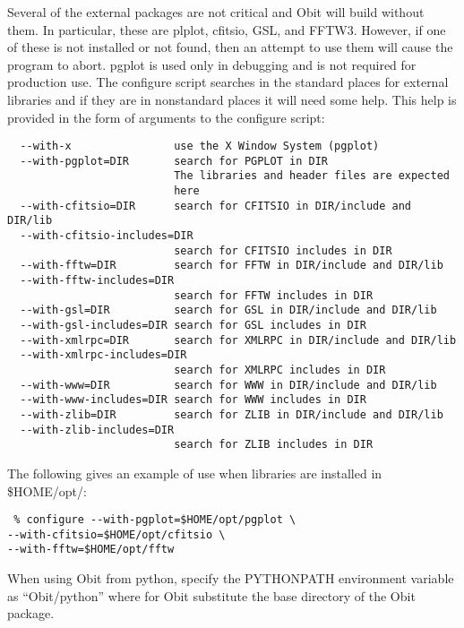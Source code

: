 \documentclass[11pt]{article}
\begin{document}
Several of the external packages are not critical and Obit will build
without them.
In particular, these are plplot, cfitsio, GSL, and FFTW3.
However, if one of these is not installed or not found, then an attempt
to use them will cause the program to abort.
pgplot is used only in debugging and is not required for production use.
The configure script searches in the standard places for external
libraries and if they are in nonstandard places it will need some
help.
This help is provided in the form of arguments to the configure script:
\begin{verbatim}
  --with-x                use the X Window System (pgplot)
  --with-pgplot=DIR       search for PGPLOT in DIR
                          The libraries and header files are expected
                          here
  --with-cfitsio=DIR      search for CFITSIO in DIR/include and DIR/lib
  --with-cfitsio-includes=DIR
                          search for CFITSIO includes in DIR
  --with-fftw=DIR         search for FFTW in DIR/include and DIR/lib
  --with-fftw-includes=DIR
                          search for FFTW includes in DIR
  --with-gsl=DIR          search for GSL in DIR/include and DIR/lib
  --with-gsl-includes=DIR search for GSL includes in DIR
  --with-xmlrpc=DIR       search for XMLRPC in DIR/include and DIR/lib
  --with-xmlrpc-includes=DIR
                          search for XMLRPC includes in DIR
  --with-www=DIR          search for WWW in DIR/include and DIR/lib
  --with-www-includes=DIR search for WWW includes in DIR
  --with-zlib=DIR         search for ZLIB in DIR/include and DIR/lib
  --with-zlib-includes=DIR
                          search for ZLIB includes in DIR
\end{verbatim}

The following gives an example of use when libraries are installed in
\$HOME/opt/:
\begin{verbatim}
 % configure --with-pgplot=$HOME/opt/pgplot \
--with-cfitsio=$HOME/opt/cfitsio \
--with-fftw=$HOME/opt/fftw
\end{verbatim}

When using Obit from python, specify the PYTHONPATH environment
variable as ``Obit/python'' where for Obit substitute the base
directory of the Obit package. 
\end{document}
